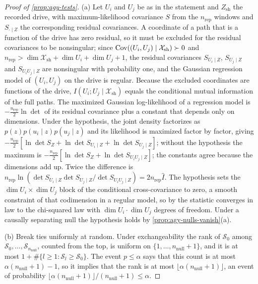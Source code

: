 \begin{proof}[Proof of \cref{prop:agy-tests}]
(a) Let $U_i$ and $U_j$ be as in the statement and $Z_{\mathrm{sh}}$ the recorded drive, with maximum-likelihood covariance $S$ from the $n_{\mathrm{rep}}$ windows and $S_{\cdot\mid Z}$ the corresponding residual covariances. A coordinate of a path that is a function of the drive has zero residual, so it must be excluded for the residual covariances to be nonsingular; since $\operatorname{Cov}((U_i,U_j)\mid\mathcal X_{\mathrm{sh}})\succ0$ and $n_{\mathrm{rep}}>\dim\mathcal X_{\mathrm{sh}}+\dim U_i+\dim U_j+1$, the residual covariances $S_{U_i\mid Z}$, $S_{U_j\mid Z}$ and $S_{U_iU_j\mid Z}$ are nonsingular with probability one, and the Gaussian regression model of $(U_i,U_j)$ on the drive is regular. Because the excluded coordinates are functions of the drive, $I(U_i;U_j\mid\mathcal X_{\mathrm{sh}})$ equals the conditional mutual information of the full paths. The maximized Gaussian log-likelihood of a regression model is $-\frac{n_{\mathrm{rep}}}2\ln\det$ of its residual covariance plus a constant that depends only on dimensions. Under the hypothesis, the joint density factorizes as $p(z)p(u_i\mid z)p(u_j\mid z)$ and its likelihood is maximized factor by factor, giving $-\frac{n_{\mathrm{rep}}}2[\ln\det S_Z+\ln\det S_{U_i\mid Z}+\ln\det S_{U_j\mid Z}]$; without the hypothesis the maximum is $-\frac{n_{\mathrm{rep}}}2[\ln\det S_Z+\ln\det S_{U_iU_j\mid Z}]$; the constants agree because the dimensions add up. Twice the difference is $n_{\mathrm{rep}}\ln(\det S_{U_i\mid Z}\det S_{U_j\mid Z}/\det S_{U_iU_j\mid Z})=2n_{\mathrm{rep}}\hat I$. The hypothesis sets the $\dim U_i\times\dim U_j$ block of the conditional cross-covariance to zero, a smooth constraint of that codimension in a regular model, so by \citet{wilks1938large} the statistic converges in law to the chi-squared law with $\dim U_i\cdot\dim U_j$ degrees of freedom. Under a causally separating null the hypothesis holds by \cref{prop:agy-nulls-vanish}(a).

(b) Break ties uniformly at random. Under exchangeability the rank of $\mathcal S_0$ among $\mathcal S_0,\dots,\mathcal S_{n_{\mathrm{null}}}$, counted from the top, is uniform on $\{1,\dots,n_{\mathrm{null}}+1\}$, and it is at most $1+\#\{l\ge1:\mathcal S_l\ge\mathcal S_0\}$. The event $p\le\alpha$ says that this count is at most $\alpha(n_{\mathrm{null}}+1)-1$, so it implies that the rank is at most $\lfloor\alpha(n_{\mathrm{null}}+1)\rfloor$, an event of probability $\lfloor\alpha(n_{\mathrm{null}}+1)\rfloor/(n_{\mathrm{null}}+1)\le\alpha$.
\end{proof}

